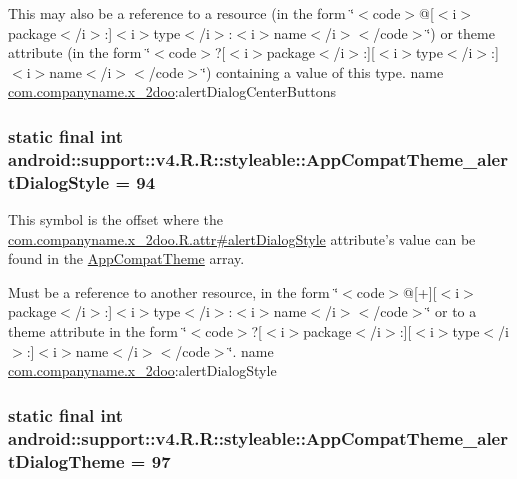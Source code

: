 This may also be a reference to a resource (in the form \char`\"{}$<$code$>$@\mbox{[}$<$i$>$package$<$/i$>$:\mbox{]}$<$i$>$type$<$/i$>$:$<$i$>$name$<$/i$>$$<$/code$>$\char`\"{}) or theme attribute (in the form \char`\"{}$<$code$>$?\mbox{[}$<$i$>$package$<$/i$>$:\mbox{]}\mbox{[}$<$i$>$type$<$/i$>$:\mbox{]}$<$i$>$name$<$/i$>$$<$/code$>$\char`\"{}) containing a value of this type.  name \hyperlink{namespacecom_1_1companyname_1_1x__2doo}{com.companyname.x\_\-2doo}:alertDialogCenterButtons \hypertarget{classandroid_1_1support_1_1v4_1_1_r_1_1styleable_41bab9fb72c63ddb10915533169e3216}{
\subsubsection[{AppCompatTheme\_\-alertDialogStyle}]{\setlength{\rightskip}{0pt plus 5cm}static final int android::support::v4.R.R::styleable::AppCompatTheme\_\-alertDialogStyle = 94}}
\label{classandroid_1_1support_1_1v4_1_1_r_1_1styleable_41bab9fb72c63ddb10915533169e3216}


This symbol is the offset where the \hyperlink{classcom_1_1companyname_1_1x__2doo_1_1_r_1_1attr_ca8747c978fa93cc513a775a9affb210}{com.companyname.x\_\-2doo.R.attr\#alertDialogStyle} attribute's value can be found in the \hyperlink{classandroid_1_1support_1_1v4_1_1_r_1_1styleable_0873e92ba21076bb5a4aeadeb7f5779f}{AppCompatTheme} array.

Must be a reference to another resource, in the form \char`\"{}$<$code$>$@\mbox{[}+\mbox{]}\mbox{[}$<$i$>$package$<$/i$>$:\mbox{]}$<$i$>$type$<$/i$>$:$<$i$>$name$<$/i$>$$<$/code$>$\char`\"{} or to a theme attribute in the form \char`\"{}$<$code$>$?\mbox{[}$<$i$>$package$<$/i$>$:\mbox{]}\mbox{[}$<$i$>$type$<$/i$>$:\mbox{]}$<$i$>$name$<$/i$>$$<$/code$>$\char`\"{}.  name \hyperlink{namespacecom_1_1companyname_1_1x__2doo}{com.companyname.x\_\-2doo}:alertDialogStyle \hypertarget{classandroid_1_1support_1_1v4_1_1_r_1_1styleable_58e5759eace5641f42a4605d7670b7da}{
\subsubsection[{AppCompatTheme\_\-alertDialogTheme}]{\setlength{\rightskip}{0pt plus 5cm}static final int android::support::v4.R.R::styleable::AppCompatTheme\_\-alertDialogTheme = 97}}
\label{classandroid_1_1support_1_1v4_1_1_r_1_1styleable_58e5759eace5641f42a4605d7670b7da}


